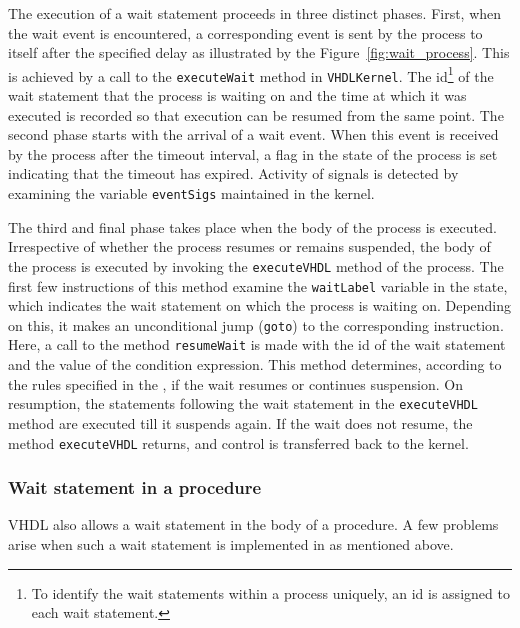 \documentclass[11pt]{article}
\begin{document}
The execution of a wait statement proceeds in three distinct phases.
First, when the wait event is encountered, a corresponding event is
sent by the process to itself after the specified delay as illustrated
by the Figure~\ref{fig:wait_process}.  This is achieved by a call to
the \texttt{executeWait} method in \texttt{VHDLKernel}.  The
id\footnote{To identify the wait statements within a process uniquely,
an id is assigned to each wait statement.} of the wait statement that
the process is waiting on and the time at which it was executed is
recorded so that execution can be resumed from the same point.  The
second phase starts with the arrival of a wait event.  When this event
is received by the process after the timeout interval, a flag in the
state of the process is set indicating that the timeout has expired.
Activity of signals is detected by examining the variable
\texttt{eventSigs} maintained in the kernel.

The third and final phase takes place when the body of the process is
executed.  Irrespective of whether the process resumes or remains
suspended, the body of the process is executed by invoking the
\texttt{executeVHDL} method of the process.  The first few instructions of
this method examine the \texttt{waitLabel} variable in the state, which
indicates the wait statement on which the process is waiting on.
Depending on this, it makes an unconditional jump (\texttt{goto}) to the
corresponding instruction.  Here, a call to the method \texttt{resumeWait}
is made with the id of the wait statement and the value of the condition
expression.  This method determines, according to the rules specified in
the \LRM, if the wait resumes or continues suspension.  On resumption, the
statements following the wait statement in the \texttt{executeVHDL} method
are executed till it suspends again.  If the wait does not resume, the
method \texttt{executeVHDL} returns, and control is transferred back to
the kernel.

\subsubsection{Wait statement in a procedure}

VHDL also allows a wait statement in the body of a procedure.  A few
problems arise when such a wait statement is implemented in \tyvis\/
as mentioned above.
\end{document}
